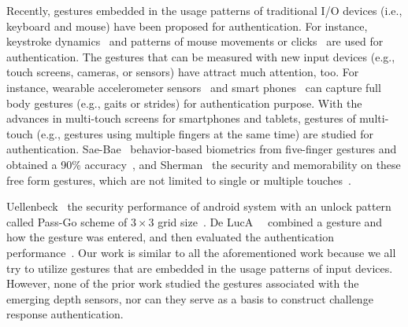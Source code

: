 Recently, gestures embedded in the usage patterns of traditional I/O devices (i.e., keyboard and mouse) have been proposed for authentication. For instance, keystroke dynamics~\cite{Revett:springerlink:10,Monrose:CCS99,Monrose97keystroke,Shavlik01keystroke} and patterns of mouse movements or clicks~\cite{Ahmed:TPDS07,Jorgensen11mouse} are used for authentication.
The gestures that can be measured with new input devices (e.g., touch screens, cameras, or sensors) have attract much attention, too. For instance, wearable accelerometer sensors~\cite{Gafurov2007} and smart phones~\cite{Derawi:2013} can capture full body gestures (e.g., gaits or strides) for authentication purpose. %
With the advances in multi-touch screens for smartphones and tablets, %
gestures of multi-touch (e.g., gestures using multiple fingers at the same time) are studied for authentication. Sae-Bae~ behavior-based biometrics from five-finger gestures and obtained a 90\% accuracy~\cite{SaeBaeCHI2012}, and Sherman~ the security and memorability on these free form gestures, which are not limited to single or multiple touches~\cite{Sherman:2014}. 

Uellenbeck~ the security performance of android system with an unlock pattern called Pass-Go scheme of $3\times 3$ grid size~\cite{Uell:CCS13}. De LucA~\etal~ combined a gesture and how the gesture was entered, and then evaluated the authentication performance~\cite{DeLuca:2012}.  
Our work is similar to all the aforementioned work because we all try to utilize gestures that are embedded in the usage patterns of input devices. However, none of the prior work studied the gestures associated with the emerging depth sensors, nor can they serve as a basis to construct challenge response authentication.


